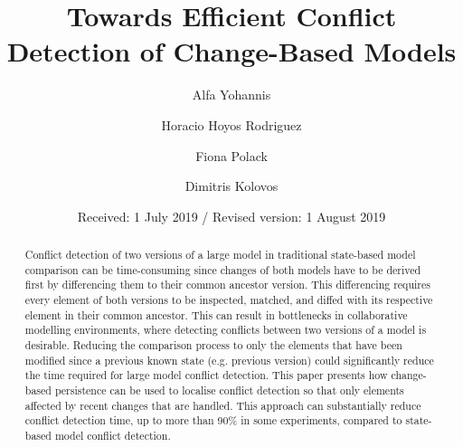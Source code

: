 
\renewcommand{\labelitemi}{$\bullet$}
\newcommand{\AndA}{\textnormal{\textbf{and }}}
\newcommand{\Is}{\textnormal{\textbf{is }}}
\newcommand{\Not}{\textnormal{\textbf{not }}}
\newcommand{\In}{\textnormal{\textbf{in }}}
\newcommand{\Or}{\textnormal{\textbf{or }}}
\newcommand{\eqnum}{\refstepcounter{equation}\textup{\tagform@{\theequation}}}

%
%

%
\title{Towards Efficient Conflict Detection of Change-Based Models}
\author{Alfa Yohannis \and Horacio Hoyos Rodriguez \and Fiona Polack \and Dimitris Kolovos%
}                     %
%
\offprints{}          %
%
%
\date{Received: 1 July 2019 / Revised version: 1 August 2019}
%
\maketitle
%
\begin{abstract}
  Conflict detection of two versions of a large model in traditional state-based model comparison can be time-consuming since changes of both models have to be derived first by differencing them to their common ancestor version. This differencing requires every element of both versions to be inspected, matched, and diffed with its respective element in their common ancestor. This can result in bottlenecks in collaborative modelling environments, where detecting conflicts between two versions of a model is desirable. Reducing the comparison process to only the elements that have been modified since a previous known state (e.g. previous version) could significantly reduce the time required for large model conflict detection. This paper presents how change-based persistence can be used to localise conflict detection so that only elements affected by recent changes that are handled. This approach can substantially reduce conflict detection time, up to more than 90\% in some experiments, compared to state-based model conflict detection. 
\end{abstract}
%

